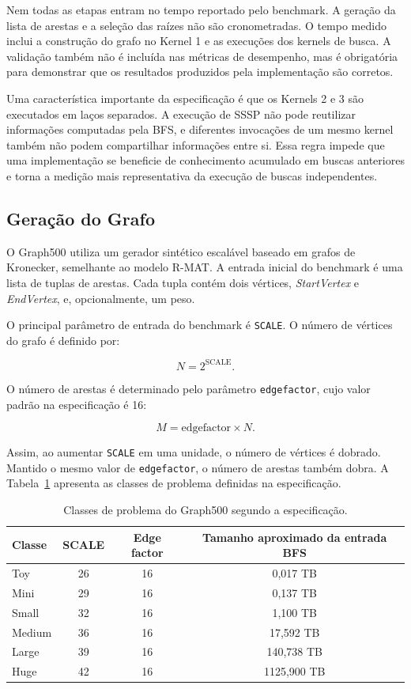 Nem todas as etapas entram no tempo reportado pelo benchmark. 
A geração da lista de arestas e a seleção das raízes não são cronometradas. 
O tempo medido inclui a construção do grafo no Kernel 1 e as execuções dos kernels de busca. 
A validação também não é incluída nas métricas de desempenho, 
mas é obrigatória para demonstrar que os resultados produzidos pela implementação são corretos.

Uma característica importante da especificação é que os Kernels 2 e 3 são executados em laços separados. 
A execução de SSSP não pode reutilizar informações computadas pela BFS, e diferentes invocações de um mesmo kernel também não podem compartilhar informações entre si. Essa regra impede que uma implementação se beneficie de conhecimento acumulado em buscas anteriores e torna a medição mais representativa da execução de buscas independentes.

\subsection{Geração do Grafo}
\label{sec:graph500-geracao-grafo}

O Graph500 utiliza um gerador sintético escalável baseado em grafos de Kronecker, semelhante ao modelo R-MAT. 
A entrada inicial do benchmark é uma lista de tuplas de arestas. 
Cada tupla contém dois vértices, \textit{StartVertex} e \textit{EndVertex}, 
e, opcionalmente, um peso. 

O principal parâmetro de entrada do benchmark é \texttt{SCALE}. O número de vértices do grafo é definido por:

\begin{equation}
N = 2^{\mathrm{SCALE}}.
\end{equation}

O número de arestas é determinado pelo parâmetro \texttt{edgefactor}, cujo valor padrão na especificação é 16:

\begin{equation}
M = \mathrm{edgefactor} \times N.
\end{equation}

Assim, ao aumentar \texttt{SCALE} em uma unidade, o número de vértices é dobrado. Mantido o mesmo valor de \texttt{edgefactor}, o número de arestas também dobra. A Tabela~\ref{tab:graph500-classes} apresenta as classes de problema definidas na especificação.

\begin{table}[H]
\centering
\begin{tabular}{l|c|c|c}
Classe & SCALE & Edge factor & Tamanho aproximado da entrada BFS \\
\hline
Toy & 26 & 16 & 0,017 TB \\
Mini & 29 & 16 & 0,137 TB \\
Small & 32 & 16 & 1,100 TB \\
Medium & 36 & 16 & 17,592 TB \\
Large & 39 & 16 & 140,738 TB \\
Huge & 42 & 16 & 1125,900 TB \\
\end{tabular}
\caption{Classes de problema do Graph500 segundo a especificação.}
\label{tab:graph500-classes}
\end{table}


